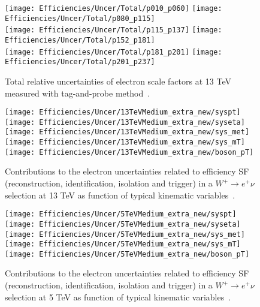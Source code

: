     \begin{figure}[htbp]
    	\centering
    	\texttt{[image: Efficiencies/Uncer/Total/p010\_p060]}
    	\texttt{[image: Efficiencies/Uncer/Total/p080\_p115]}\\
    	\texttt{[image: Efficiencies/Uncer/Total/p115\_p137]} 
    	\texttt{[image: Efficiencies/Uncer/Total/p152\_p181]}\\
    	\texttt{[image: Efficiencies/Uncer/Total/p181\_p201]}
    	\texttt{[image: Efficiencies/Uncer/Total/p201\_p237]} \\
    	\caption{Total relative uncertainties of electron scale factors at 13 TeV measured with tag-and-probe method~\cite{int_note_electrons}.}
    	\label{fig:all_uncertainty_tp}
    \end{figure}
    
    \begin{figure}[htbp]
    	\begin{center}
    		\texttt{[image: Efficiencies/Uncer/13TeVMedium\_extra\_new/syspt]}
    		\texttt{[image: Efficiencies/Uncer/13TeVMedium\_extra\_new/syseta]}
    		\texttt{[image: Efficiencies/Uncer/13TeVMedium\_extra\_new/sys\_met]}
    		\texttt{[image: Efficiencies/Uncer/13TeVMedium\_extra\_new/sys\_mT]}
    		\texttt{[image: Efficiencies/Uncer/13TeVMedium\_extra\_new/boson\_pT]}
    		\caption{Contributions to the electron uncertainties related to
    			efficiency SF (reconstruction, identification, isolation and
    			trigger) in a $W^{+}\rightarrow e^{+}\nu$ selection at 13 TeV as
    			function of typical kinematic variables~\cite{int_note_electrons}.}
    		\label{fig:total_sys_13_medium}
    	\end{center}
    \end{figure}
    
    
    \begin{figure}[htbp]
    	\begin{center}
    		\texttt{[image: Efficiencies/Uncer/5TeVMedium\_extra\_new/syspt]}
    		\texttt{[image: Efficiencies/Uncer/5TeVMedium\_extra\_new/syseta]}
    		\texttt{[image: Efficiencies/Uncer/5TeVMedium\_extra\_new/sys\_met]}
    		\texttt{[image: Efficiencies/Uncer/5TeVMedium\_extra\_new/sys\_mT]}
    		\texttt{[image: Efficiencies/Uncer/5TeVMedium\_extra\_new/boson\_pT]}
    		\caption{Contributions to the electron uncertainties related to
    			efficiency SF (reconstruction, identification, isolation and
    			trigger) in a $W^{+}\rightarrow e^{+}\nu$ selection at 5 TeV as
    			function of typical kinematic variables~\cite{int_note_electrons}.}
    		\label{fig:total_sys_5_medium}
    	\end{center}
    \end{figure}
    \clearpage
    
